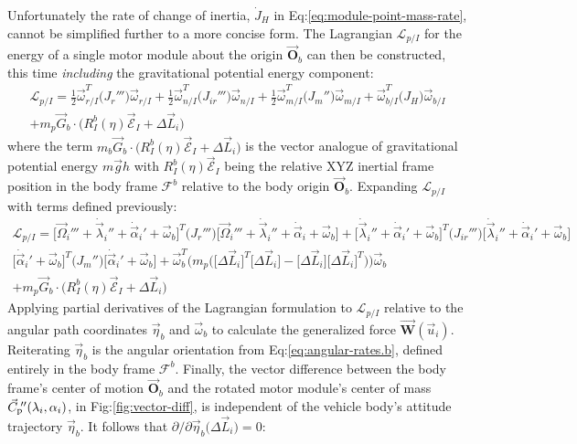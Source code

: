 Unfortunately the rate of change of inertia, $\dot{J}_H$ in Eq:\ref{eq:module-point-mass-rate}, cannot be simplified further to a more concise form. The Lagrangian $\mathcal{L}_{p/I}$ for the energy of a single motor module about the origin $\vec{\mathbf{O}}_b$ can then be constructed, this time \emph{including} the gravitational potential energy component:
\begin{multline}
\mathcal{L}_{p/I}=\frac{1}{2}\vec{\omega}_{r/I}^T\big(J_r'''\big)\vec{\omega}_{r/I}+\frac{1}{2}\vec{\omega}_{n/I}^T\big(J_{ir}'''\big)\vec{\omega}_{n/I}+\frac{1}{2}\vec{\omega}_{m/I}^T\big(J_m''\big)\vec{\omega}_{m/I}+\vec{\omega}_{b/I}^T\big(J_H)\vec{\omega}_{b/I}\\+m_p\vec{G}_b\cdot\big(R_I^b(\eta)\vec{\mathcal{E}}_I+\Delta \vec{L}_i\big)
\end{multline}
where the term $m_b\vec{G}_b\cdot\big(R_I^b(\eta)\vec{\mathcal{E}}_I+\Delta \vec{L}_i\big)$ is the vector analogue of gravitational potential energy $m\vec{g}h$ with $R_I^b(\eta)\vec{\mathcal{E}}_I$ being the relative XYZ inertial frame position in the body frame $\mathcal{F}^b$ relative to the body origin $\vec{\mathbf{O}}_b$. Expanding $\mathcal{L}_{p/I}$ with terms defined previously:
\begin{multline}
\mathcal{L}_{p/I}=\Big[\vec{\Omega}_i'''+\dot{\vec{\lambda}}_i''+\dot{\vec{\alpha}}_i'+\vec{\omega}_b\Big]^T\big(J_r'''\big)\Big[\vec{\Omega}_i'''+\dot{\vec{\lambda}}_i''+\dot{\vec{\alpha}}_i+\vec{\omega}_b\Big]+\Big[\dot{\vec{\lambda}}_i''+\dot{\vec{\alpha}}_i'+\vec{\omega}_b\Big]^T\big(J_{ir}'''\big)\Big[\dot{\vec{\lambda}}_i''+\dot{\vec{\alpha}}_i'+\vec{\omega}_b\Big]
\\
\Big[\dot{\vec{\alpha}}_i'+\vec{\omega}_b\Big]^T\big(J_m''\big)\Big[\dot{\vec{\alpha}}_i'+\vec{\omega}_b\Big]+\vec{\omega}_{b}^T\big(m_p\Big(\big[\Delta \vec{L}_i\big]^T\big[\Delta \vec{L}_i\big]-\big[\Delta \vec{L}_i\big]\big[\Delta \vec{L}_i\big]^T\Big)\big)\vec{\omega}_{b}
\\
+m_p\vec{G}_b\cdot\big(R_I^b(\eta)\vec{\mathcal{E}}_I+\Delta \vec{L}_i\big)
\end{multline}
Applying partial derivatives of the Lagrangian formulation to $\mathcal{L}_{p/I}$ relative to the angular path coordinates $\vec{\eta}_b$ and $\vec{\omega}_b$ to calculate the generalized force $\vec{\mathbf{W}}(\vec{u}_i)$. Reiterating $\vec{\eta}_b$ is the angular orientation from Eq:\ref{eq:angular-rates.b}, defined entirely in the body frame $\mathcal{F}^b$. Finally, the vector difference between the body frame's center of motion $\vec{\mathbf{O}}_b$ and the rotated motor module's center of mass $\vec{C}_\text{p}\text{}\hspace{-2pt}''(\lambda_i,\alpha_i)$, in Fig:\ref{fig:vector-diff}, is independent of the vehicle body's attitude trajectory $\vec{\eta}_b$. It follows that $\partial/\partial\vec{\eta}_b\big(\Delta \vec{L}_i\big) = 0$:
